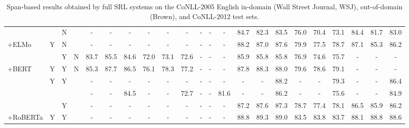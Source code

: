 \begin{table*}[t]
\begin{center}
{\begin{tabular}{lccccccccccccccccccccc}
\rowcolor{gray!15}
\citet{ouchi-etal-2018-span} & & N & & - & - & - & - & - & - & - & - & - & 84.7 & 82.3 & 83.5 & 76.0 & 70.4 & 73.1 & 84.4 & 81.7 & 83.0\\
\rowcolor{gray!15}
\quad+ELMo & Y & N & & - & - & - & - & - & - & - & - & - & 88.2 & 87.0 & 87.6 & 79.9 & 77.5 & 78.7 & 87.1 & 85.3 & 86.2\\
\citet{DBLP:conf/emnlp/ZhouLZ20} & & Y & N & 83.7 & 85.5 & 84.6 & 72.0 & 73.1 & 72.6 & - & - & - & 85.9 & 85.8 & 85.8 & 76.9 & 74.6 & 75.7 & - & - & -\\
\quad+BERT & Y & Y & N & 85.3 & 87.7 & 86.5 & 76.1 & 78.3 & 77.2 & - & - & - & 87.8 & 88.3 & 88.0 & 79.6 & 78.6 & 79.1 & - & - & -\\
\rowcolor{gray!15}
\citet{DBLP:conf/acl/WangJWSW19} & Y & Y & & - & - & - & - & - & - & - & - & - & - & - & 88.2 & - & - & 79.3 & - & - & 86.4 \\
\citet{DBLP:conf/aaai/JiaYWT22} & & & & - & - & 84.5 & - & - & 72.7 & - & - & 81.6 & - & - & 86.2 & - & - & 75.6 & - & - & 84.9\\

\rowcolor{gray!15}
\citet{fei2021better} &  & Y & & - & - & - & - & - & - & - & - & - & 87.2  & 87.6 & 87.3 & 78.7 &77.4 &78.1 & 86.5 & 85.9 & 86.2 \\
\rowcolor{gray!15} \quad+RoBERTa & Y & Y & & - & - & - & - & - & - & - & - & - & 88.8 & 89.3 & 89.0 & 83.5 & 83.8 & 83.7 & 88.1 & 88.8 & 88.6 \\

\bottomrule
\end{tabular}
}
\caption{
Span-based results obtained by full SRL systems on the CoNLL-2005 English in-domain (Wall Street Journal, WSJ), out-of-domain (Brown), and CoNLL-2012 test sets.
}
\label{tab:result-05}
\end{center}
\vspace{-2mm}
\end{table*}